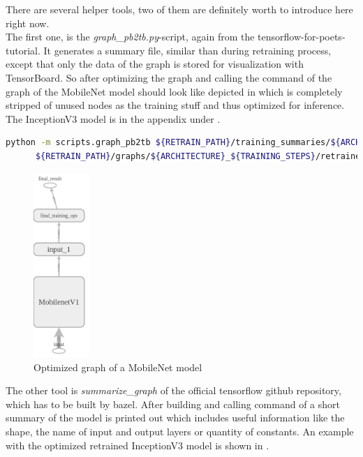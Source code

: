 There are several helper tools, two of them are definitely worth to introduce here right now. \\

The first one, is the \textit{graph_pb2tb.py}-script, again from the tensorflow-for-poets-tutorial. It generates a summary file, similar than during retraining process, except that only the data of the graph is stored for visualization with TensorBoard. So after optimizing the graph and calling the command of  the graph of the MobileNet model should look like depicted in  which is completely stripped of unused nodes as the training stuff and thus optimized for inference. The InceptionV3 model is in the appendix under . \\

\begin{minipage}{\linewidth}
\begin{lstlisting}[caption=Call of \textit{graph_pb2tb.py}, label=list:graph_pb2tb, language=bash]
	python -m scripts.graph_pb2tb ${RETRAIN_PATH}/training_summaries/${ARCHITECTURE}_${TRAINING_STEPS}/${ARCHITECTURE}_${TRAINING_STEPS}_${LEARNING_RATE}/retrained \
	  ${RETRAIN_PATH}/graphs/${ARCHITECTURE}_${TRAINING_STEPS}/retrained_dog_graph_${ARCHITECTURE}_${TRAINING_STEPS}_${LEARNING_RATE}.pb 
\end{lstlisting}
\end{minipage}

\begin{figure}[htbp]
\centering
\includegraphics[height=7cm]{includes/graphMobilenet050-700Opt4}
\caption[Optimized graph of a MobileNet model]{Optimized graph of a MobileNet model}
\label{fig:MobileNetGraphOpt4}
\end{figure}


The other tool is \textit{summarize_graph} of the official tensorflow github repository, which has to be built by bazel. After building and calling command of  a short summary of the model is printed out which includes useful information like the shape, the name of input and output layers or quantity of constants. An example with the optimized retrained InceptionV3 model is shown in .

